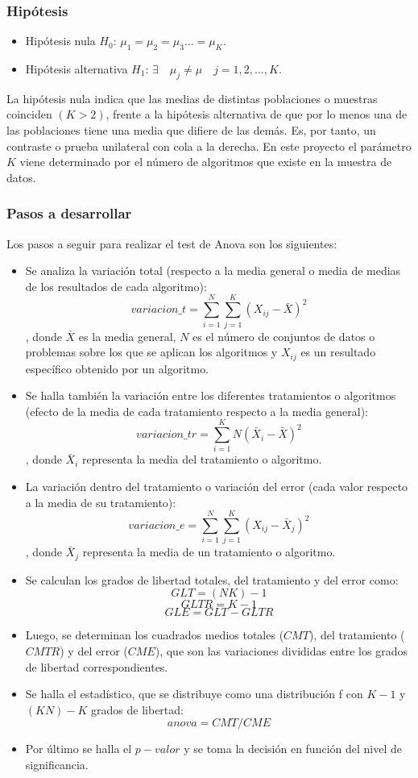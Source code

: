 \subsubsection{Hipótesis}
\begin{itemize}
\item Hipótesis nula $H_0$: $\mu_1 = \mu_2 = \mu_3 ... = \mu_K$.
\item Hipótesis alternativa $H_1$: $\exists \quad \mu_j \neq \mu \quad j=1,2,...,K$.
\end{itemize}
La hipótesis nula indica que las medias de distintas poblaciones o muestras coinciden $(K>2)$, frente a la
hipótesis alternativa de que por lo menos una de las poblaciones tiene una media que difiere de las demás. Es,
por tanto, un contraste o prueba unilateral con cola a la derecha. En este proyecto el parámetro $K$ viene
determinado por el número de algoritmos que existe en la muestra de datos.

\subsubsection{Pasos a desarrollar}
Los pasos a seguir para realizar el test de Anova son los siguientes:
\begin{itemize}
\item Se analiza la variación total (respecto a la media general o media de medias de los resultados de cada
algoritmo):
\[ variacion\_t = \sum_{i=1}^{N} \sum_{j=1}^{K} (X_{ij} - \bar{X})^2 \]
, donde $\bar{X}$ es la media general, $N$ es el número de conjuntos de datos o problemas sobre los que se
aplican los algoritmos y $X_{ij}$ es un resultado específico obtenido por un algoritmo.
\item Se halla también la variación entre los diferentes tratamientos o algoritmos (efecto de la media de cada
tratamiento respecto a la media general):
\[ variacion\_tr = \sum_{i=1}^{K} N (\bar{X}_i - \bar{X})^2 \]
, donde $\bar{X}_i$ representa la media del tratamiento o algoritmo.
\item La variación dentro del tratamiento o variación del error (cada valor respecto a la media de su tratamiento):
\[ variacion\_e = \sum_{i=1}^{N} \sum_{j=1}^{K} (X_{ij} - \bar{X}_{j})^2 \]
, donde $\bar{X}_{j}$ representa la media de un tratamiento o algoritmo.
\item Se calculan los grados de libertad totales, del tratamiento y del error como:
\[ GLT = (NK)-1 \]
\[ GLTR = K-1 \]
\[ GLE = GLT - GLTR \]
\item Luego, se determinan los cuadrados medios totales ($CMT$), del tratamiento ($CMTR$) y del error ($CME$),
que son las variaciones divididas entre los grados de libertad correspondientes.
\item Se halla el estadístico, que se distribuye como una distribución f con $K-1$ y $(KN)-K$ grados de libertad:
\[ anova = CMT / CME \]
\item Por último se halla el $p-valor$ y se toma la decisión en función del nivel de significancia.
\end{itemize}

